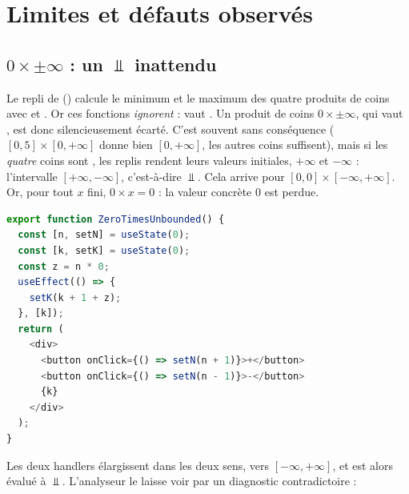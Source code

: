\section{Limites et défauts observés}
\label{sec:treillis-simples-limites}

\subsection{$0 \times \pm\infty$ : un $\Bot$ inattendu}

Le repli de  ()
calcule le minimum et le maximum des quatre produits de coins avec
 et . Or ces fonctions \emph{ignorent}
 :  vaut . Un produit de coins
$0 \times \pm\infty$, qui vaut , est donc silencieusement écarté.
C'est souvent sans conséquence ($[0,5] \times [0,+\infty]$ donne bien
$[0,+\infty]$, les autres coins suffisent), mais si les \emph{quatre} coins
sont , les replis rendent leurs valeurs initiales, $+\infty$ et
$-\infty$ : l'intervalle $[+\infty, -\infty]$, c'est-à-dire $\Bot$. Cela
arrive pour $[0,0] \times [-\infty, +\infty]$. Or, pour tout $x$ fini,
$0 \times x = 0$ : la valeur concrète $0$ est perdue.

\begin{lstlisting}[language=TypeScript,caption={Un produit par zéro d'un état non borné (\file{/tmp/ch09/limits.tsx}, extrait)},label={lst:treillis-simples-zero}]
export function ZeroTimesUnbounded() {
  const [n, setN] = useState(0);
  const [k, setK] = useState(0);
  const z = n * 0;
  useEffect(() => {
    setK(k + 1 + z);
  }, [k]);
  return (
    <div>
      <button onClick={() => setN(n + 1)}>+</button>
      <button onClick={() => setN(n - 1)}>-</button>
      {k}
    </div>
  );
}
\end{lstlisting}

Les deux handlers élargissent  dans les deux sens, vers
$[-\infty, +\infty]$, et  est alors évalué à $\Bot$.
L'analyseur le laisse voir par un diagnostic contradictoire :


